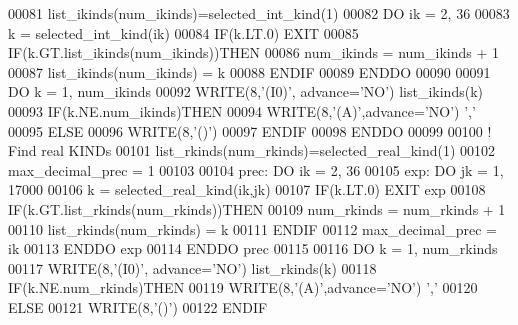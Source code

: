 \begin{DoxyCode}
00081       list\_ikinds(num\_ikinds)=selected\_int\_kind(1)
00082       \textcolor{keywordflow}{DO} ik = 2, 36
00083          k = selected\_int\_kind(ik)
00084          \textcolor{keywordflow}{IF}(k.LT.0) \textcolor{keywordflow}{EXIT}
00085          \textcolor{keywordflow}{IF}(k.GT.list\_ikinds(num\_ikinds))\textcolor{keywordflow}{THEN}
00086             num\_ikinds = num\_ikinds + 1
00087             list\_ikinds(num\_ikinds) = k
00088 \textcolor{keywordflow}{         ENDIF}
00089 \textcolor{keywordflow}{      ENDDO}
00090 
00091       \textcolor{keywordflow}{DO} k = 1, num\_ikinds
00092          \textcolor{keyword}{WRITE}(8,\textcolor{stringliteral}{'(I0)'}, advance=\textcolor{stringliteral}{'NO'}) list\_ikinds(k)
00093          \textcolor{keywordflow}{IF}(k.NE.num\_ikinds)\textcolor{keywordflow}{THEN}
00094             \textcolor{keyword}{WRITE}(8,\textcolor{stringliteral}{'(A)'},advance=\textcolor{stringliteral}{'NO'}) \textcolor{stringliteral}{','}
00095          \textcolor{keywordflow}{ELSE}
00096             \textcolor{keyword}{WRITE}(8,\textcolor{stringliteral}{'()'})
00097 \textcolor{keywordflow}{         ENDIF}
00098 \textcolor{keywordflow}{      ENDDO}
00099 
00100       \textcolor{comment}{! Find real KINDs}
00101       list\_rkinds(num\_rkinds)=selected\_real\_kind(1)
00102       max\_decimal\_prec = 1
00103 
00104       prec: \textcolor{keywordflow}{DO} ik = 2, 36
00105          exp: \textcolor{keywordflow}{DO} jk = 1, 17000
00106             k = selected\_real\_kind(ik,jk)
00107             \textcolor{keywordflow}{IF}(k.LT.0) \textcolor{keywordflow}{EXIT} exp
00108             \textcolor{keywordflow}{IF}(k.GT.list\_rkinds(num\_rkinds))\textcolor{keywordflow}{THEN}
00109                num\_rkinds = num\_rkinds + 1
00110                list\_rkinds(num\_rkinds) = k
00111 \textcolor{keywordflow}{            ENDIF}
00112             max\_decimal\_prec = ik
00113 \textcolor{keywordflow}{         ENDDO} exp
00114 \textcolor{keywordflow}{      ENDDO} prec
00115 
00116       \textcolor{keywordflow}{DO} k = 1, num\_rkinds
00117          \textcolor{keyword}{WRITE}(8,\textcolor{stringliteral}{'(I0)'}, advance=\textcolor{stringliteral}{'NO'}) list\_rkinds(k)
00118          \textcolor{keywordflow}{IF}(k.NE.num\_rkinds)\textcolor{keywordflow}{THEN}
00119             \textcolor{keyword}{WRITE}(8,\textcolor{stringliteral}{'(A)'},advance=\textcolor{stringliteral}{'NO'}) \textcolor{stringliteral}{','}
00120          \textcolor{keywordflow}{ELSE}
00121             \textcolor{keyword}{WRITE}(8,\textcolor{stringliteral}{'()'})
00122 \textcolor{keywordflow}{         ENDIF}

\end{DoxyCode}
